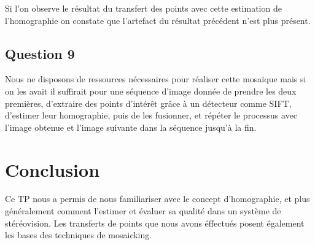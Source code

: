 \documentclass[12pt]{report}
\begin{document}
Si l'on observe le résultat du transfert des points avec cette estimation de l'homographie on constate que l'artefact du résultat précédent n'est plus présent.

\subsection{Question 9}

Nous ne disposons de ressources nécessaires pour réaliser cette mosaïque mais si on les avait il suffirait pour une séquence d'image donnée de prendre les deux premières, d'extraire des points d'intérêt grâce à un détecteur comme SIFT, d'estimer leur homographie, puis de les fusionner, et répéter le processus avec l'image obtenue et l'image suivante dans la séquence jusqu'à la fin.

\section{Conclusion}
 
Ce TP nous a permis de nous familiariser avec le concept d'homographie, et plus généralement comment l'estimer et évaluer sa qualité dans un système de stéréovision. Les transferts de points que nous avons éffectués posent également les bases des techniques de mosaicking. 

\newpage



\renewcommand*\listfigurename{\large Liste des figures}
\listoffigures
\newpage
\end{document}
